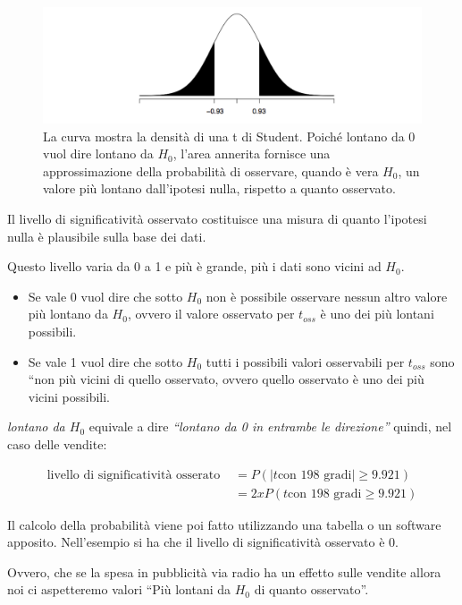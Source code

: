 \begin{figure}[htbp]
\centering
\includegraphics{./notes/immagini/l6-fig7.png}
\caption{La curva mostra la densità di una t di Student. Poiché lontano da 0 vuol dire lontano da $ H_0 $, l'area annerita fornisce una approssimazione della probabilità di osservare, quando è vera $ H_0 $, un valore più lontano dall'ipotesi nulla, rispetto a quanto osservato.}
\end{figure}

Il livello di significatività osservato costituisce una misura di quanto
l'ipotesi nulla è plausibile sulla base dei dati.

Questo livello varia da 0 a 1 e più è grande, più i dati sono vicini ad $ H_0 $.

\begin{itemize}
\item
  Se vale 0 vuol dire che sotto $ H_0 $ non è possibile osservare nessun
  altro valore più lontano da $ H_0 $, ovvero il valore osservato per $ t_{oss} $
  è uno dei più lontani possibili.
\item
  Se vale 1 vuol dire che sotto $ H_0 $ tutti i possibili valori osservabili
  per $ t_{oss} $ sono ``non più vicini di quello osservato, ovvero quello
  osservato è uno dei più vicini possibili.
\end{itemize}

\emph{lontano da $ H_0 $} equivale a dire \emph{``lontano da 0 in entrambe le
direzione''} quindi, nel caso delle vendite:

\begin{align*}
\text{livello di significatività osserato } &= P(|t \text{con 198 gradi}| \geq 9.921) \\
														           &= 2xP(t \text{con 198 gradi} \geq 9.921)
\end{align*}

Il calcolo della probabilità viene poi fatto utilizzando una tabella o
un software apposito. Nell'esempio si ha che il livello di significatività osservato è 0.

Ovvero, che se la spesa in pubblicità via radio ha un effetto sulle vendite allora noi ci aspetteremo valori ``Più lontani da $ H_0 $ di quanto
osservato''.

